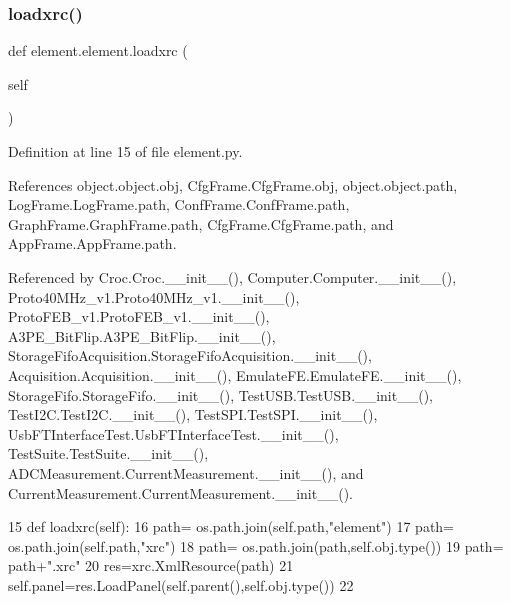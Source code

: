 \subsubsection{\texorpdfstring{loadxrc()}{loadxrc()}}
{\footnotesize\ttfamily def element.\+element.\+loadxrc (\begin{DoxyParamCaption}\item[{}]{self }\end{DoxyParamCaption})}



Definition at line 15 of file element.\+py.



References object.\+object.\+obj, Cfg\+Frame.\+Cfg\+Frame.\+obj, object.\+object.\+path, Log\+Frame.\+Log\+Frame.\+path, Conf\+Frame.\+Conf\+Frame.\+path, Graph\+Frame.\+Graph\+Frame.\+path, Cfg\+Frame.\+Cfg\+Frame.\+path, and App\+Frame.\+App\+Frame.\+path.



Referenced by Croc.\+Croc.\+\_\+\+\_\+init\+\_\+\+\_\+(), Computer.\+Computer.\+\_\+\+\_\+init\+\_\+\+\_\+(), Proto40\+M\+Hz\+\_\+v1.\+Proto40\+M\+Hz\+\_\+v1.\+\_\+\+\_\+init\+\_\+\+\_\+(), Proto\+F\+E\+B\+\_\+v1.\+Proto\+F\+E\+B\+\_\+v1.\+\_\+\+\_\+init\+\_\+\+\_\+(), A3\+P\+E\+\_\+\+Bit\+Flip.\+A3\+P\+E\+\_\+\+Bit\+Flip.\+\_\+\+\_\+init\+\_\+\+\_\+(), Storage\+Fifo\+Acquisition.\+Storage\+Fifo\+Acquisition.\+\_\+\+\_\+init\+\_\+\+\_\+(), Acquisition.\+Acquisition.\+\_\+\+\_\+init\+\_\+\+\_\+(), Emulate\+F\+E.\+Emulate\+F\+E.\+\_\+\+\_\+init\+\_\+\+\_\+(), Storage\+Fifo.\+Storage\+Fifo.\+\_\+\+\_\+init\+\_\+\+\_\+(), Test\+U\+S\+B.\+Test\+U\+S\+B.\+\_\+\+\_\+init\+\_\+\+\_\+(), Test\+I2\+C.\+Test\+I2\+C.\+\_\+\+\_\+init\+\_\+\+\_\+(), Test\+S\+P\+I.\+Test\+S\+P\+I.\+\_\+\+\_\+init\+\_\+\+\_\+(), Usb\+F\+T\+Interface\+Test.\+Usb\+F\+T\+Interface\+Test.\+\_\+\+\_\+init\+\_\+\+\_\+(), Test\+Suite.\+Test\+Suite.\+\_\+\+\_\+init\+\_\+\+\_\+(), A\+D\+C\+Measurement.\+Current\+Measurement.\+\_\+\+\_\+init\+\_\+\+\_\+(), and Current\+Measurement.\+Current\+Measurement.\+\_\+\+\_\+init\+\_\+\+\_\+().


\begin{DoxyCode}
15     \textcolor{keyword}{def }loadxrc(self):
16         path= os.path.join(self.path,\textcolor{stringliteral}{"element"})
17         path= os.path.join(self.path,\textcolor{stringliteral}{"xrc"})
18         path= os.path.join(path,self.obj.type())
19         path= path+\textcolor{stringliteral}{".xrc"}
20         res=xrc.XmlResource(path)
21         self.panel=res.LoadPanel(self.parent(),self.obj.type())
22             
\end{DoxyCode}
\mbox{\label{classelement_1_1element_a80c5e09b291c255b740787b87760fca0}} 
